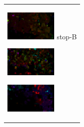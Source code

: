 \begin{figure}[htbp]
\begin{tabular}{l}
\begin{minipage}{0.165\hsize}
\begin{center}
          \hspace{0.0cm} { }
        \end{center}
      \end{minipage}
      \begin{minipage}{0.165\hsize}
        \begin{center}
          \includegraphics[clip, width=2.5cm]{./Figures/optic_stop2-3.eps}
          \hspace{2.0cm} {stop-B}
        \end{center}
      \end{minipage}
      \begin{minipage}{0.165\hsize}
        \begin{center}
          \includegraphics[clip, width=2.5cm]{./Figures/optic_stop2-4.eps}
          \hspace{0.1cm} { }
        \end{center}
      \end{minipage}
      \begin{minipage}{0.165\hsize}
        \begin{center}
          \includegraphics[clip, width=2.5cm]{./Figures/optic_stop2-5.eps}
          \hspace{2.2cm} { }
        \end{center}
      \end{minipage}
\\ %


\end{tabular}
\end{figure}
